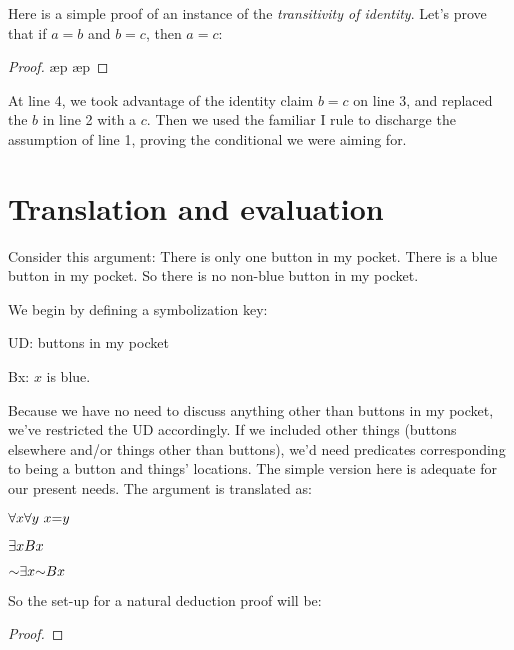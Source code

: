Here is a simple proof of an instance of the \emph{transitivity of identity}. Let's prove that if $a{=}b$ and $b{=}c$, then $a{=}c$:

\begin{proof}
	\open
		\ae{p}
		\ae{p}
	\close
	 
\end{proof}

At line 4, we took advantage of the identity claim $b{=}c$ on line 3, and replaced the $b$ in line 2 with a $c$. Then we used the familiar \eif{}I rule to discharge the assumption of line 1, proving the conditional we were aiming for.


\section{Translation and evaluation}

Consider this argument: There is only one button in my pocket. There is a blue button in my pocket. So there is no non-blue button in my pocket.

We begin by defining a symbolization key:
\begin{ekey}
\item{UD:} buttons in my pocket
\item{Bx:} $x$ is blue.
\end{ekey}
Because we have no need to discuss anything other than buttons in my pocket, we've restricted the UD accordingly. If we included other things (buttons elsewhere and/or things other than buttons), we'd need predicates corresponding to being a button and things' locations. The simple version here is adequate for our present needs. The argument is translated as:
\begin{earg}
\item{} $\qt{\forall}{x} \qt{\forall}{y}\ x{=}y$
\item{} $\exists x Bx$
\item{\therefore} $\enot \qt{\exists}{x} \enot Bx$
\end{earg}

So the set-up for a natural deduction proof will be:

\begin{proof}
	 \pr{}
	 
	\have{}{}{}
\end{proof}

